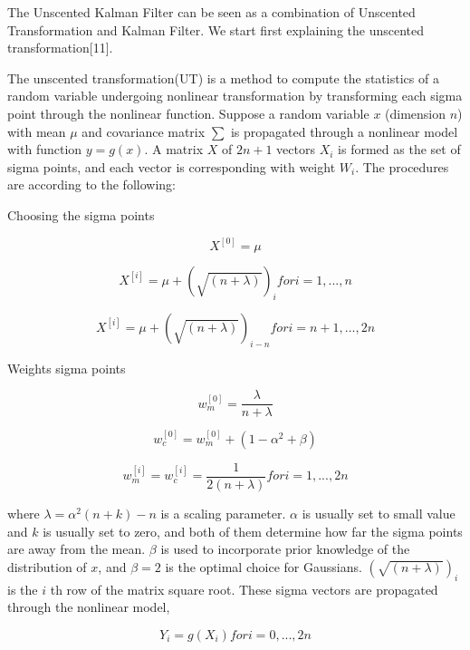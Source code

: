 \documentclass[10pt,twocolumn,letterpaper]{article}
\begin{document}
The Unscented Kalman Filter can be seen as a combination of Unscented Transformation and Kalman Filter. We start first explaining the unscented transformation[11].

The unscented transformation(UT) is a method to compute the statistics of a random variable undergoing nonlinear transformation by transforming each sigma point through the nonlinear function. Suppose a random variable $x$ (dimension $n$) with mean $\mu$ and covariance matrix $
\sum$ is propagated through a nonlinear model with function $y=g(x)$. A matrix $X$ of $2n+1$ vectors $X_i$ is formed as the set of sigma points, and each vector is corresponding with weight $W_i$. The procedures are according to the following:

Choosing the sigma points

\begin{equation}
X^{[0]}=\mu
\end{equation}

\begin{equation}
X^{[i]}=\mu+(\sqrt{(n+\lambda)})_i for i=1, ..., n
\end{equation}

\begin{equation}
X^{[i]}=\mu+(\sqrt{(n+\lambda)})_{i-n} for i=n+1, ..., 2n
\end{equation}

Weights sigma points

\begin{equation}
w_m^{[0]}=\frac{\lambda}{n+\lambda}
\end{equation}

\begin{equation}
w_c^{[0]}=w_m^{[0]}+(1-\alpha^2+\beta)
\end{equation}

\begin{equation}
w_m^{[i]}=w_c^{[i]}=\frac{1}{2(n+\lambda)} for i=1, ..., 2n
\end{equation}

where $\lambda=\alpha^2(n+k)-n$ is a scaling parameter. $\alpha$ is usually set to small value and $k$ is usually set to zero, and both of them determine how far the sigma points are away from the mean. $\beta$ is used to incorporate prior knowledge of the distribution of $x$, and $\beta=2$ is the optimal choice for Gaussians. $(\sqrt{(n+\lambda)})_i$ is the $i$ th row of the matrix square root. These sigma vectors are propagated through the nonlinear model,

\begin{equation}
Y_i=g(X_i) for i=0, ..., 2n
\end{equation}
\end{document}

